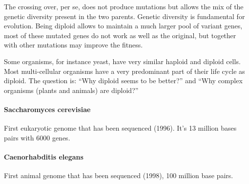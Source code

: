 The crossing over, per se, does not produce mutations
but allows the mix of the genetic diversity present in the two parents. Genetic
diversity is fundamental for evolution. Being diploid allows to maintain a much
larger pool of variant genes, most of these mutated genes do not work as well
as the original, but together with other mutations may improve the fitness.

Some organisms, for instance yeast, have very similar haploid and diploid
cells. Most multi-cellular organisms have a very predominant part of their life
cycle as diploid. The question is: ``Why diploid seems to be better?'' and ``Why
complex organisms (plants and animals) are diploid?''

\paragraph*{Saccharomyces cerevisiae}
First eukaryotic genome that has been sequenced (1996). It's 13 million bases
pairs with 6000 genes.

\paragraph*{Caenorhabditis elegans}
First animal genome that has been sequenced (1998), 100 million base pairs.
